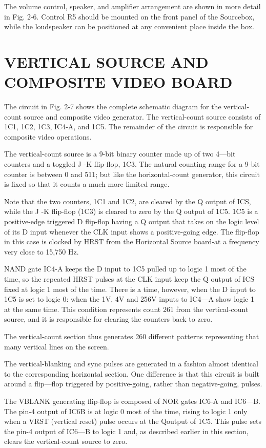 \documentclass[11pt]{book}              %
\begin{document}
The volume control, speaker, and amplifier arrangement are shown in more detail in Fig. 2-6. Control R5 should be mounted on the front panel of the Sourcebox, while the loudspeaker can be positioned at any convenient place inside the box.

\section{VERTICAL SOURCE AND COMPOSITE VIDEO BOARD}

The circuit in Fig. 2-7 shows the complete schematic diagram for the vertical-count source and composite video generator. The vertical-count source consists of 1C1, 1C2, 1C3, IC4-A, and 1C5. The remainder of the circuit is responsible for composite video operations.

The vertical-count source is a 9-bit binary counter made up of two 4—bit counters and a toggled J -K flip-flop, 1C3. The natural counting range for a 9-bit counter is between 0 and 511; but like the horizontal-count generator, this circuit is fixed so that it counts a much more limited range.

Note that the two counters, 1C1 and 1C2, are cleared by the Q output of ICS, while the J -K flip-flop (1C3) is cleared to zero by the Q output of 1C5. 1C5 is a positive-edge triggered D flip-flop having a Q output that takes on the logic level of its D input whenever the CLK input shows a positive-going edge. The flip-flop in this case is clocked by HRST from the Horizontal Source board-at a frequency very close to 15,750 Hz.

NAND gate IC4-A keeps the D input to 1C5 pulled up to logic 1 most of the time, so the repeated HRST pulses at the CLK input keep the Q output of ICS fixed at logic 1 most of the time. There is a time, however, when the D input to 1C5 is set to logic 0: when the 1V, 4V and 256V inputs to IC4—A show logic 1 at the same time. This condition represents count 261 from the vertical-count source, and it is responsible for clearing the counters back to zero.

The vertical-count section thus generates 260 different patterns representing that many vertical lines on the screen.

The vertical-blanking and sync pulses are generated in a fashion almost identical to the corresponding horizontal section. One difference is that this circuit is built around a flip—flop triggered by positive-going, rather than negative-going, pulses.

The VBLANK generating flip-flop is composed of NOR gates IC6-A and IC6—B. The pin-4 output of IC6B is at logic 0 most of the time, rising to logic 1 only when a VRST (vertical reset) pulse occurs at the Qoutput of 1C5. This pulse sets the pin-4 output of IC6—B to logic 1 and, as described earlier in this section, clears the vertical-count source to zero.
\end{document}
